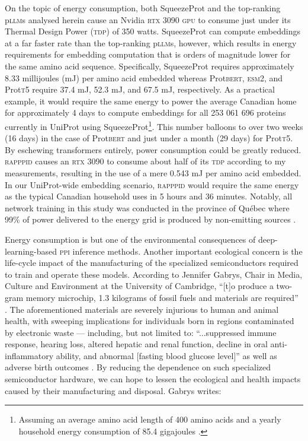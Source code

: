 On the topic of energy consumption, both SqueezeProt and the top-ranking p\textsc{llm}s analysed herein cause an Nvidia \textsc{rtx} 3090 \textsc{gpu} to consume just under its Thermal Design Power (\textsc{tdp}) of 350 watts. SqueezeProt can compute embeddings at a far faster rate than the top-ranking p\textsc{llm}s, however, which results in energy requirements for embedding computation that is orders of magnitude lower for the same amino acid sequence. Specifically, SqueezeProt requires approximately 8.33 millijoules (mJ) per amino acid embedded whereas Prot\textsc{bert}, \textsc{esm2}, and Prot\textsc{t5} require 37.4 mJ, 52.3 mJ, and 67.5 mJ, respectively. As a practical example, it would require the same energy to power the average Canadian home for approximately 4 days to compute embeddings for all 253 061 696 proteins currently in UniProt using SqueezeProt\footnote{Assuming an average amino acid length of 400 amino acids and a yearly household energy consumption of 85.4 gigajoules \cite{the_uniprot_consortium_uniprot_2023, statscan_energy_consumption}.}. This number balloons to over two weeks (16 days) in the case of Prot\textsc{bert} and just under a month (29 days) for Prot\textsc{t5}. By eschewing transformers entirely, power consumption could be greatly reduced. \textsc{rapppid} causes an \textsc{rtx} 3090 to consume about half of its \textsc{tdp} according to my measurements, resulting in the use of a mere 0.543 mJ per amino acid embedded. In our UniProt-wide embedding scenario, \textsc{rapppid} would require the same energy as the typical Canadian household uses in 5 hours and 36 minutes. Notably, all network training in this study was conducted in the province of Qu\'ebec where 99\% of power delivered to the energy grid is produced by non-emitting sources \cite{canada_energy_regulator_canadas_2021}.

Energy consumption is but one of the environmental consequences of deep-learning-based \textsc{ppi} inference methods. Another important ecological concern is the life-cycle impact of the manufacturing of the specialized semiconductors required to train and operate these models. According to Jennifer Gabrys, Chair in Media, Culture and Environment at the University of Cambridge, ``[t]o produce a two-gram memory microchip, 1.3 kilograms of fossil fuels and materials are required'' \cite{silicon_elephants}. The aforementioned materials are severely injurious to human and animal health, with sweeping implications for individuals born in regions contaminated by electronic waste --- including, but not limited to: ``...suppressed immune response, hearing loss, altered hepatic and renal function, decline in oral anti-inflammatory ability, and abnormal [fasting blood glucose level]'' as well as adverse birth outcomes \cite{Parvez2021}. By reducing the dependence on such specialized semiconductor hardware, we can hope to lessen the ecological and health impacts caused by their manufacturing and disposal. Gabrys writes:

